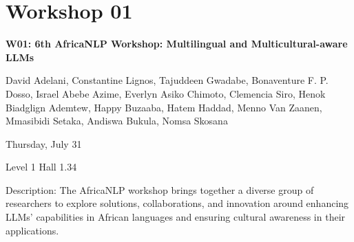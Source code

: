
\clearpage



\section[W01: 6th AfricaNLP Workshop: Multilingual and Multicultural-aware LLMs]{Workshop 01}
\label{workshop_1}

\begin{center}
    {\Large \textbf{W01: 6th AfricaNLP Workshop: Multilingual and Multicultural-aware LLMs}}\\
   
    \vspace{5mm}

    David Adelani, Constantine Lignos, Tajuddeen Gwadabe, Bonaventure F. P. Dosso, Israel Abebe Azime, Everlyn Asiko Chimoto, Clemencia Siro, Henok Biadglign Ademtew, Happy Buzaaba, Hatem Haddad, Menno Van Zaanen, Mmasibidi Setaka, Andiswa Bukula, Nomsa Skosana

    \vspace{5mm}

    Thursday, July 31
    
    Level 1 Hall 1.34

\end{center}

Description: The AfricaNLP workshop brings together a diverse group of researchers to explore solutions, collaborations, and innovation around enhancing LLMs’ capabilities in African languages and ensuring cultural awareness in their applications. 

